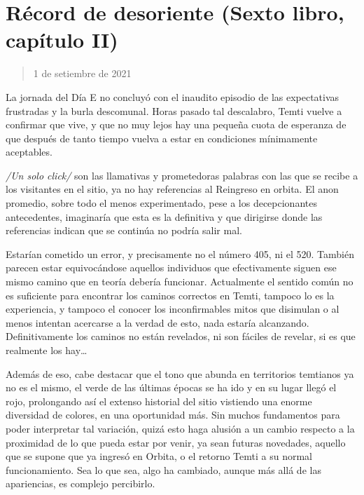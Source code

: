 \documentclass[
]{book}
\begin{document}
\hypertarget{ruxe9cord-de-desoriente-sexto-libro-capuxedtulo-ii}{%
\section{Récord de desoriente (Sexto libro, capítulo II)}\label{ruxe9cord-de-desoriente-sexto-libro-capuxedtulo-ii}}

\begin{quote}
1 de setiembre de 2021
\end{quote}

La jornada del Día E no concluyó con el inaudito episodio de las expectativas frustradas y la burla descomunal. Horas pasado tal descalabro, Temti vuelve a confirmar que vive, y que no muy lejos hay una pequeña cuota de esperanza de que después de tanto tiempo vuelva a estar en condiciones mínimamente aceptables.

\emph{/Un solo click/} son las llamativas y prometedoras palabras con las que se recibe a los visitantes en el sitio, ya no hay referencias al Reingreso en orbita. El anon promedio, sobre todo el menos experimentado, pese a los decepcionantes antecedentes, imaginaría que esta es la definitiva y que dirigirse donde las referencias indican que se continúa no podría salir mal.

Estarían cometido un error, y precisamente no el número 405, ni el 520. También parecen estar equivocándose aquellos individuos que efectivamente siguen ese mismo camino que en teoría debería funcionar. Actualmente el sentido común no es suficiente para encontrar los caminos correctos en Temti, tampoco lo es la experiencia, y tampoco el conocer los inconfirmables mitos que disimulan o al menos intentan acercarse a la verdad de esto, nada estaría alcanzando. Definitivamente los caminos no están revelados, ni son fáciles de revelar, si es que realmente los hay\ldots{}

Además de eso, cabe destacar que el tono que abunda en territorios temtianos ya no es el mismo, el verde de las últimas épocas se ha ido y en su lugar llegó el rojo, prolongando así el extenso historial del sitio vistiendo una enorme diversidad de colores, en una oportunidad más. Sin muchos fundamentos para poder interpretar tal variación, quizá esto haga alusión a un cambio respecto a la proximidad de lo que pueda estar por venir, ya sean futuras novedades, aquello que se supone que ya ingresó en Orbita, o el retorno Temti a su normal funcionamiento. Sea lo que sea, algo ha cambiado, aunque más allá de las apariencias, es complejo percibirlo.
\end{document}
